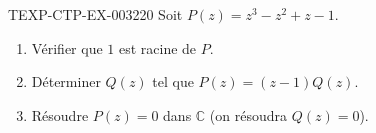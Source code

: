 \begin{exercice}{TEXP-CTP-EX-003}{2}{20}
Soit $P(z)=z^3-z^2+z-1$.
\begin{enumerate}
  \item Vérifier que $1$ est racine de $P$.
  \item Déterminer $Q(z)$ tel que $P(z)=(z-1)Q(z)$.
  \item Résoudre $P(z)=0$ dans $\mathbb{C}$ (on résoudra $Q(z)=0$).
\end{enumerate}
\end{exercice}
